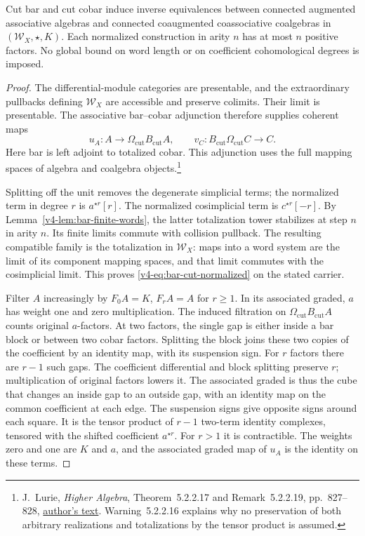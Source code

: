\begin{theorem}\label{v4-thm:bar-cut-duality}
Cut bar and cut cobar induce inverse equivalences between connected
augmented associative algebras and connected coaugmented
coassociative coalgebras in \((\mathcal W_X,\star,K)\).
Each normalized construction in arity \(n\) has at most \(n\)
positive factors. No global bound on word length or on coefficient
cohomological degrees is imposed.
\end{theorem}

\begin{proof}
The differential-module categories are presentable, and the
extraordinary pullbacks defining \(\mathcal W_X\) are accessible
and preserve colimits. Their limit is presentable. The associative
bar--cobar adjunction therefore supplies coherent maps
\[
 u_A:A\longrightarrow\Omega_{\mathrm{cut}}B_{\mathrm{cut}}A,
 \qquad
 v_C:B_{\mathrm{cut}}\Omega_{\mathrm{cut}}C\longrightarrow C.
\]
Here bar is left adjoint to totalized cobar. This adjunction uses
the full mapping spaces of algebra and coalgebra objects.\footnote{
J.~Lurie, \emph{Higher Algebra}, Theorem~5.2.2.17 and
Remark~5.2.2.19, pp.~827--828,
\href{https://people.math.harvard.edu/~lurie/papers/HA.pdf}{author's text}.
Warning~5.2.2.16 explains why no preservation of both arbitrary
realizations and totalizations by the tensor product is assumed.}

Splitting off the unit removes the degenerate simplicial terms;
the normalized term in degree \(r\) is \(a^{\star r}[r]\).
The normalized cosimplicial term is \(c^{\star r}[-r]\).
By Lemma~\ref{v4-lem:bar-finite-words}, the latter totalization
tower stabilizes at step \(n\) in arity \(n\). Its finite limits
commute with collision pullback. The resulting compatible family
is the totalization in \(\mathcal W_X\): maps into a word system
are the limit of its component mapping spaces, and that limit
commutes with the cosimplicial limit. This proves
\eqref{v4-eq:bar-cut-normalized} on the stated carrier.

Filter \(A\) increasingly by \(F_0A=K\), \(F_rA=A\) for
\(r\geq1\). In its associated graded, \(a\) has weight one and
zero multiplication. The induced filtration on
\(\Omega_{\mathrm{cut}}B_{\mathrm{cut}}A\) counts original
\(a\)-factors. At two factors, the single gap is either inside a
bar block or between two cobar factors. Splitting the block joins
these two copies of the coefficient by an identity map, with its
suspension sign. For \(r\) factors there are \(r-1\) such gaps.
The coefficient differential and block splitting preserve
\(r\); multiplication of original factors lowers it. The
associated graded is thus the cube that changes an inside gap to
an outside gap, with an identity map on the common coefficient at
each edge. The suspension signs give opposite signs around each
square. It is the tensor product of \(r-1\) two-term identity
complexes, tensored with the shifted coefficient
\(a^{\star r}\). For \(r>1\) it is contractible. The weights zero
and one are \(K\) and \(a\), and the associated graded map of
\(u_A\) is the identity on these terms.


\end{proof}
